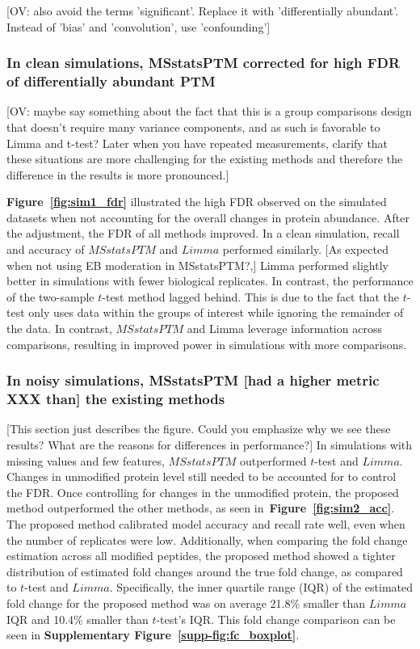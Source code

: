 \documentclass[mcp]{article}
\numberwithin{table}{section}
\def\todo#1{{\color{red}[#1]}}
\def\figref#1{{\bf Figure~\ref{fig:#1}}}
\begin{document}
\todo{OV: also avoid the terms 'significant'. Replace it with 'differentially abundant'. Instead of 'bias' and 'convolution', use 'confounding'}

\subsubsection*{In clean simulations, MSstatsPTM corrected for high FDR of differentially abundant PTM}

\todo{OV: maybe say something about the fact that this is a group comparisons design that doesn't require many variance components, and as such is favorable to Limma and t-test? Later when you have repeated measurements, clarify that these situations are more challenging for the existing methods and therefore the difference in the results is more pronounced.}

\figref{sim1_fdr} illustrated the high FDR observed on the simulated datasets when not accounting for the overall changes in protein abundance. After the adjustment, the FDR of all methods improved. In a clean simulation, recall and accuracy of $MSstatsPTM$ and $Limma$ performed similarly. \todo{As expected when not using EB moderation in MSstatsPTM?,} Limma performed slightly better in simulations with fewer biological replicates. In contrast, the performance of the two-sample $t$-test method lagged behind. This is due to the fact that the $t$-test only uses data within the groups of interest while ignoring the remainder of the data. In contrast, $MSstatsPTM$ and Limma leverage information across comparisons, resulting in improved power in simulations with more comparisons. 

\subsubsection*{In noisy simulations, MSstatsPTM \todo{had a higher metric XXX than} the existing methods}

\todo{This section just describes the figure. Could you emphasize why we see these results? What are the reasons for differences in performance?} In simulations with missing values and few features, $MSstatsPTM$ outperformed $t$-test and $Limma$. Changes in unmodified protein level still needed to be accounted for to control the FDR. Once controlling for changes in the unmodified protein, the proposed method outperformed the other methods, as seen in~\figref{sim2_acc}. The proposed method calibrated model accuracy and recall rate well, even when the number of replicates were low. Additionally, when comparing the fold change estimation across all modified peptides, the proposed method showed a tighter distribution of estimated fold changes around the true fold change, as compared to $t$-test and $Limma$. Specifically, the inner quartile range (IQR) of the estimated fold change for the proposed method was on average 21.8\% smaller than $Limma$ IQR and 10.4\% smaller than $t$-test's IQR. This fold change comparison can be seen in {\bf Supplementary Figure~\ref{supp-fig:fc_boxplot}}.
\end{document}
